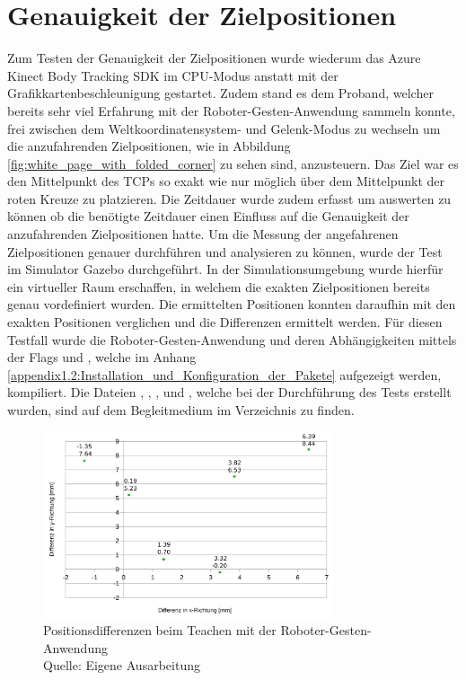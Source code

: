 \section{Genauigkeit der Zielpositionen}
Zum Testen der Genauigkeit der Zielpositionen wurde wiederum das Azure Kinect Body Tracking SDK im CPU-Modus anstatt mit der Grafikkartenbeschleunigung gestartet. Zudem stand es dem Proband, welcher bereits sehr viel Erfahrung mit der Roboter-Gesten-Anwendung sammeln konnte, frei zwischen dem Weltkoordinatensystem- und Gelenk-Modus zu wechseln um die anzufahrenden Zielpositionen, wie in Abbildung \ref{fig:white_page_with_folded_corner} zu sehen sind, anzusteuern. Das Ziel war es den Mittelpunkt des TCPs so exakt wie nur möglich über dem Mittelpunkt der roten Kreuze zu platzieren. Die Zeitdauer wurde zudem erfasst um auswerten zu können ob die benötigte Zeitdauer einen Einfluss auf die Genauigkeit der anzufahrenden Zielpositionen hatte. Um die Messung der angefahrenen Zielpositionen genauer durchführen und analysieren zu können, wurde der Test im Simulator Gazebo durchgeführt. In der Simulationsumgebung wurde hierfür ein virtueller Raum erschaffen, in welchem die exakten Zielpositionen bereits genau vordefiniert wurden. Die ermittelten Positionen konnten daraufhin mit den exakten Positionen verglichen und die Differenzen ermittelt werden. Für diesen Testfall wurde die Roboter-Gesten-Anwendung und deren Abhängigkeiten mittels der Flags  und , welche im Anhang \ref{appendix1.2:Installation_und_Konfiguration_der_Pakete} aufgezeigt werden, kompiliert. Die Dateien , , ,   und , welche bei der Durchführung des Tests erstellt wurden, sind auf dem Begleitmedium im Verzeichnis  zu finden.

\begin{figure}[htb]
	\centering
	\includegraphics[width=0.761\textwidth]{images/ergebnisse/Differenzen_beim_Teachen_mit_Gesten}
	\caption[Positionsdifferenzen beim Teachen mit der Roboter-Gesten-Anwendung]{Positionsdifferenzen beim Teachen mit der Roboter-Gesten-Anwendung\\Quelle: Eigene Ausarbeitung}
	\label{fig:measurement_teaching_positions_differences}
\end{figure}
\FloatBarrier

